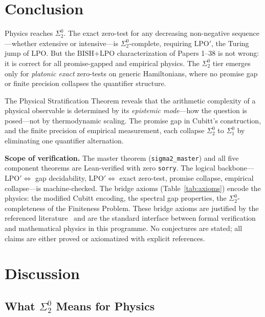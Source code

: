 \documentclass[11pt,a4paper]{article}
\theoremstyle{plain}
\theoremstyle{definition}
\newcommand{\LPO}{\ensuremath{\mathrm{LPO}}}
\newcommand{\LPOj}{\ensuremath{\mathrm{LPO'}}}
\newcommand{\BISH}{\ensuremath{\mathrm{BISH}}}
\begin{document}
\section{Conclusion}\label{sec:conclusion}

Physics reaches $\Sigma_2^0$.  The exact zero-test for any decreasing
non-negative sequence---whether extensive or intensive---is
$\Sigma_2^0$-complete, requiring $\LPOj$, the Turing jump of $\LPO$.
But the $\BISH$+$\LPO$ characterization of Papers 1--38 is not wrong:
it is correct for all promise-gapped and empirical physics.
The $\Sigma_2^0$ tier emerges only for \emph{platonic exact}
zero-tests on generic Hamiltonians, where no promise gap or
finite precision collapses the quantifier structure.

The Physical Stratification Theorem reveals that the arithmetic
complexity of a physical observable is determined by its
\emph{epistemic mode}---how the question is posed---not by
thermodynamic scaling.  The promise gap in Cubitt's construction,
and the finite precision of empirical measurement, each collapse
$\Sigma_2^0$ to $\Sigma_1^0$ by eliminating one quantifier alternation.

\medskip\noindent
\textbf{Scope of verification.}
The master theorem (\texttt{sigma2\_master}) and all five
component theorems are Lean-verified with zero \texttt{sorry}.
The logical backbone---$\LPOj \Leftrightarrow$ gap decidability,
$\LPOj \Leftrightarrow$ exact zero-test, promise collapse, empirical
collapse---is machine-checked.  The bridge axioms
(Table~\ref{tab:axioms}) encode the physics: the modified Cubitt
encoding, the spectral gap properties, the $\Sigma_2^0$-completeness
of the Finiteness Problem.  These bridge axioms are justified by
the referenced literature~\cite{CPgW2015,BCO2018,Rogers1967} and
are the standard interface between formal verification and
mathematical physics in this programme.  No conjectures are
stated; all claims are either proved or axiomatized with
explicit references.

\section{Discussion}\label{sec:discussion}

\subsection{What $\Sigma_2^0$ Means for Physics}
\end{document}

